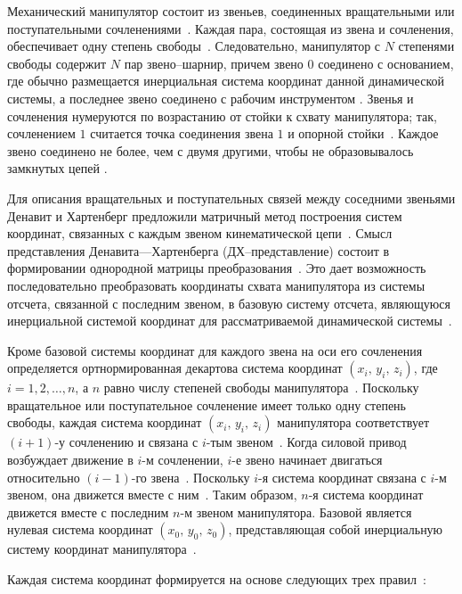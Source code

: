 \documentclass[oneside, final, 14pt]{extarticle}
\begin{document}
\par
Механический манипулятор состоит из звеньев, соединенных вращательными или поступательными сочленениями~\cite{fu:rob_tech}.
Каждая пара, состоящая из звена и сочленения, обеспечивает одну степень свободы~\cite{fu:rob_tech}.
Следовательно, манипулятор с \(N\) степенями свободы содержит \(N\) пар звено--шарнир, причем звено \(0\) соединено с основанием, где обычно размещается инерциальная система координат данной динамической системы, а последнее звено соединено с рабочим инструментом \cite{fu:rob_tech}.
Звенья и сочленения нумеруются по возрастанию от стойки к схвату манипулятора; так, сочленением \(1\) считается точка соединения звена \(1\) и опорной стойки~\cite{fu:rob_tech}.
Каждое звено соединено не более, чем с двумя другими, чтобы не образовывалось замкнутых цепей \cite{fu:rob_tech}.
\par
Для описания вращательных и поступательных связей между соседними звеньями Денавит и Хартенберг предложили матричный метод построения систем координат, связанных с каждым звеном кинематической цепи~\cite{fu:rob_tech}.
Смысл представления Денавита---Хартенберга (ДХ--представление) состоит в формировании однородной матрицы преобразования~\cite{fu:rob_tech}.
Это дает возможность последовательно преобразовать координаты схвата манипулятора из системы отсчета, связанной с последним звеном, в базовую систему отсчета, являющуюся инерциальной системой координат для рассматриваемой динамической системы~\cite{fu:rob_tech}.
\par
Кроме базовой системы координат для каждого звена на оси его сочленения определяется ортнормированная декартова система координат \((x_i,\,y_i,\,z_i)\), где \(i = 1, 2, \ldots, n\), а \(n\) равно числу степеней свободы манипулятора~\cite{fu:rob_tech}.
Поскольку вращательное или поступательное сочленение имеет только одну степень свободы, каждая система координат \((x_i,\,y_i,\,z_i)\) манипулятора соответствует \((i + 1)\)-у сочленению и связана с \(i\)-тым звеном~\cite{fu:rob_tech}.
Когда силовой привод возбуждает движение в \(i\)-м сочленении, \(i\)-е звено начинает двигаться относительно \((i - 1)\)-го звена~\cite{fu:rob_tech}.
Поскольку \(i\)-я система координат связана с \(i\)-м звеном, она движется вместе с ним~\cite{fu:rob_tech}.
Таким образом, \(n\)-я система координат движется вместе с последним \(n\)-м звеном манипулятора.
Базовой является нулевая система координат \((x_0,\,y_0,\,z_0)\), представляющая собой инерциальную систему координат манипулятора~\cite{fu:rob_tech}.
\par
Каждая система координат формируется на основе следующих трех правил~\cite{fu:rob_tech}:
\end{document}
